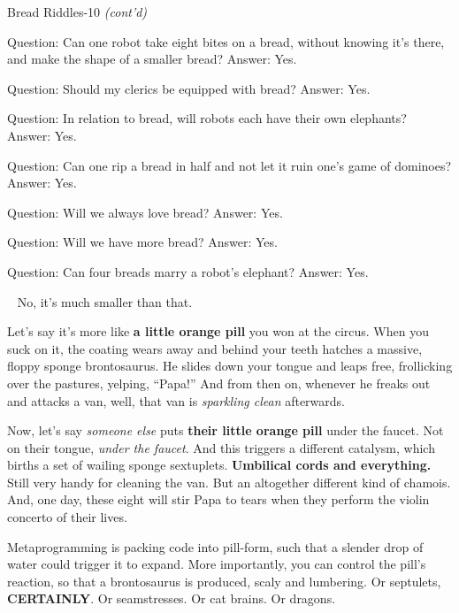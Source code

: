 \documentclass[12pt,twoside]{report}
\begin{document}
	\begin{sidebar}{Bread Riddles}{-10}		
		\textit{(cont'd)}\vspace{6pt}
		
		Question: Can one robot take eight bites on a bread, without knowing it's there, and make the shape of a smaller bread? Answer: Yes.\vspace{6pt}

		Question: Should my clerics be equipped with bread? Answer: Yes.\vspace{6pt}
		
		Question: In relation to bread, will robots each have their own elephants? Answer: Yes.\vspace{6pt}
		
		Question: Can one rip a bread in half and not let it ruin one's game of dominoes? Answer: Yes.\vspace{6pt}
		
		Question: Will we always love bread? Answer: Yes.\vspace{6pt}
		
		Question: Will we have more bread? Answer: Yes.\vspace{6pt}
		
		Question: Can four breads marry a robot's elephant? Answer: Yes.\vspace{6pt}
	\end{sidebar}

\   No, it's much
smaller than that.


Let's say it's more like {\bf a little orange pill} you won at the
circus.  When you suck on it, the coating wears away and behind your
teeth hatches a massive, floppy sponge brontosaurus.  He slides down
your tongue and leaps free, frollicking over the pastures, yelping,
``Papa!''  And from then on, whenever he freaks out and attacks a van,
well, that van is {\em sparkling clean} afterwards.

Now, let's say {\em someone else} puts {\bf their little orange pill}
under the faucet.  Not on their tongue, {\em under the faucet}.  And
this triggers a different catalysm, which births a set of wailing
sponge sextuplets.  {\bf Umbilical cords and everything.}  Still very
handy for cleaning the van. But an altogether different kind of
chamois.  And, one day, these eight will stir Papa to tears when they
perform the violin concerto of their lives.

Metaprogramming is packing code into pill-form, such that a slender
drop of water could trigger it to expand. More importantly, you can
control the pill's reaction, so that a brontosaurus is produced, scaly
and lumbering. Or septulets, {\bf CERTAINLY}.  Or seamstresses.  Or
cat brains.  Or dragons.
\end{document}
